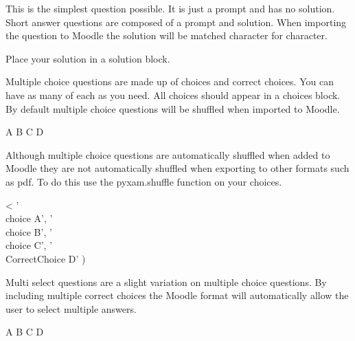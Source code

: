 \documentclass[12pt]{exam}
\begin{document}
        \begin{questions}
                This is the simplest question possible. It is just a prompt and has no solution.
                Short answer questions are composed of a prompt and solution. When importing the question to Moodle the
                solution will be matched character for character.
                \begin{solution}
                    Place your solution in a solution block.
                \end{solution}
                Multiple choice questions are made up of choices and correct choices. You can have as many of each as
                you need. All choices should appear in a choices block. By default multiple choice questions will be
                shuffled when imported to Moodle.
                \begin{choices}
                    \choice A
                    \choice B
                    \choice C
                    \CorrectChoice D
                \end{choices}
                Although multiple choice questions are automatically shuffled when added to Moodle they are not
                automatically shuffled when exporting to other formats such as pdf. To do this use the pyxam.shuffle
                function on your choices.
                \begin{choices}
                    <%
                        '\\choice A',
                        '\\choice B',
                        '\\choice C',
                        '\\CorrectChoice D'
                    )%
                \end{choices}
                Multi select questions are a slight variation on multiple choice questions. By including multiple
                correct choices the Moodle format will automatically allow the user to select multiple answers.
                \begin{choices}
                    \choice A
                    \CorrectChoice B
                    \choice C
                    \CorrectChoice D
                \end{choices}

\end{questions}
\end{document}
